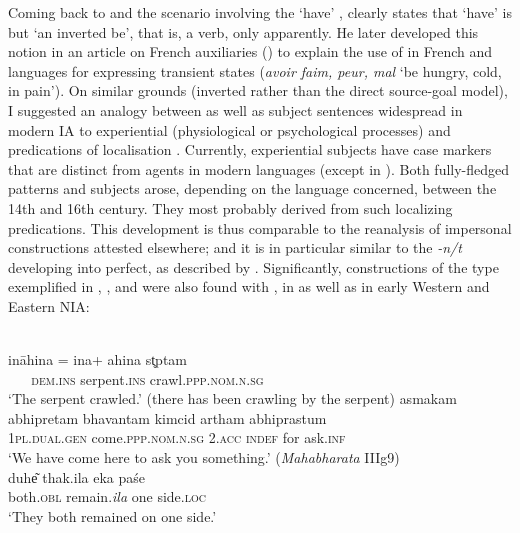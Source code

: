 \documentclass[output=paper]{langsci/langscibook}
\begin{document}
Coming back to \citeauthor{Benveniste1952} and the  scenario involving the ‘have’ , \citet{Benveniste1952} clearly states that ‘have’ is but ‘an inverted be’, that is, a  verb,  only apparently. He later developed this notion in an article on French auxiliaries (\citeyear{Benveniste1960}) to explain the use of   in French and  languages for expressing transient states (\textit{avoir faim, peur, mal} ‘be hungry, cold, in pain’). On similar grounds (inverted   rather than the direct  source-goal model), I suggested an analogy between  as well as  subject sentences widespread in modern IA to experiential  (physiological or psychological processes) and predications of localisation \citep{Montaut2004}. 
  Currently,  experiential subjects have case markers that are distinct from  agents in modern languages (except in ). Both fully-fledged  patterns and  subjects arose, depending on the language concerned, between the 14th and 16th century. They most probably derived from such localizing predications. This development is thus comparable to the reanalysis of impersonal  constructions attested elsewhere; and it is in particular similar to the  \textit{{}-n/t}  developing into perfect, as described by \citet{Seržant2012}. Significantly, constructions of the type exemplified in , , and  were also found with  , in  as well as in early Western and Eastern NIA:

\ea
\label{ex:montaut:15}
\ea 
{}\\
\gll ināhina {\ob}= ina+    ahina{\cb}   st̥ptam\\
 ~ ~ \textsc{dem.ins} serpent.\textsc{ins}   crawl.\textsc{ppp.nom.n.sg} \\
\glt ‘The serpent crawled.’ (there has been crawling by the serpent) \citep[198]{Renou1952}
\ex 
\gll asmakam  abhipretam  bhavantam kimcid  artham  abhiprastum\\
\textsc{1pl.dual.gen}  come.\textsc{ppp.nom.n.sg}  \textsc{2.acc}  \textsc{indef}    for       ask.\textsc{inf} \\ 
\glt ‘We have come here to ask you something.’ (\textit{Mahabharata} IIIg9) \newpage
\ex   
{}\\
\gll duhe͂ thak.ila  eka     paśe \\
both.\textsc{obl} remain.\textit{ila}   one    side.\textsc{loc}  \\
\glt ‘They both remained on one side.’ \citep[947]{Chatterji1926} 
\z 
\z 
\end{document}
